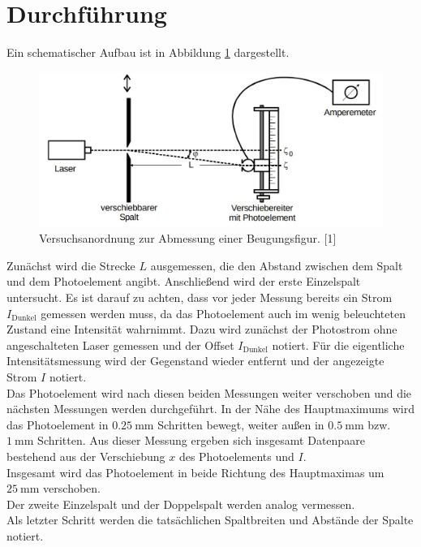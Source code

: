 \section{Durchführung}
\label{sec:Durchführung}

Ein schematischer Aufbau ist in Abbildung \ref{fig:Aufbau} dargestellt. 

\begin{figure}
  \centering
  \includegraphics[scale=0.3]{content/Aufbau.jpg}
  \caption{Versuchsanordnung zur Abmessung einer Beugungsfigur. [1]}
  \label{fig:Aufbau}
\end{figure}

Zunächst wird die Strecke $L$ ausgemessen, die den Abstand zwischen dem Spalt und dem Photoelement angibt. 
Anschließend wird der erste Einzelspalt untersucht. Es ist darauf zu achten, dass vor jeder Messung 
bereits ein Strom $I_\text{Dunkel}$ gemessen werden muss, da das Photoelement auch im wenig beleuchteten 
Zustand eine Intensität wahrnimmt. Dazu wird zunächst der Photostrom ohne angeschalteten Laser gemessen 
und der Offset $I_\text{Dunkel}$ notiert. 
Für die eigentliche Intensitätsmessung wird der Gegenstand wieder entfernt und der angezeigte Strom $I$ notiert. \\
Das Photoelement wird nach diesen beiden Messungen weiter verschoben und die nächsten Messungen werden 
durchgeführt. In der Nähe des Hauptmaximums wird das Photoelement in $\SI{0.25}{\milli\meter}$ Schritten bewegt, weiter 
außen in $\SI{0.5}{\milli\meter}$ bzw. $\SI{1}{\milli\meter}$ Schritten. Aus dieser Messung ergeben sich insgesamt 
Datenpaare bestehend aus der Verschiebung $x$ des Photoelements und $I$. \\
Insgesamt wird das Photoelement in beide Richtung des Hauptmaximas um $\SI{25}{\milli\meter}$ verschoben. \\
Der zweite Einzelspalt und der Doppelspalt werden analog vermessen. \\
Als letzter Schritt werden die tatsächlichen Spaltbreiten und Abstände der Spalte notiert. 
